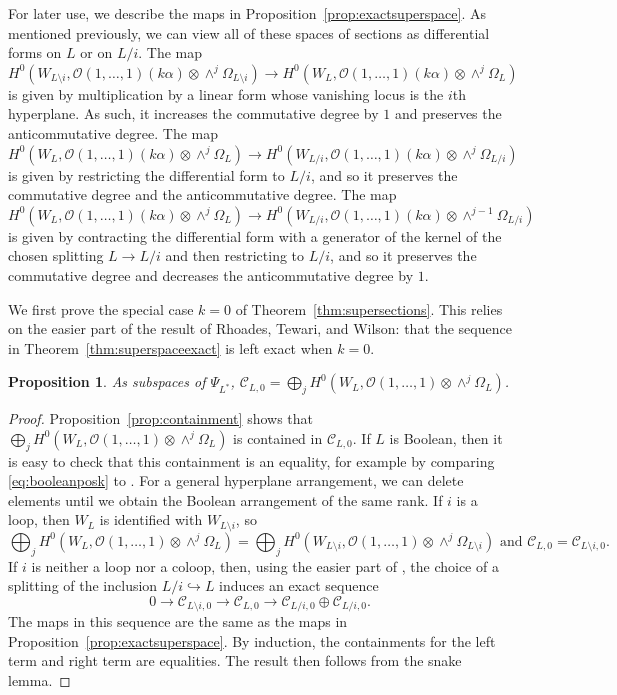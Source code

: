\documentclass{amsart}
\newtheorem{proposition}[theorem]{Proposition}
\theoremstyle{definition}
\begin{document}
For later use, we describe the maps in Proposition~\ref{prop:exactsuperspace}. As mentioned previously, we can view all of these spaces of sections as differential forms on $L$ or on $L/i$. 
The map $H^0(W_{L \setminus i}, \mathcal{O}(1, \dotsc, 1)(k\alpha) \otimes \wedge^j \Omega_{L \setminus i}) \to H^0(W_{L}, \mathcal{O}(1, \dotsc, 1)(k\alpha) \otimes \wedge^j \Omega_L)$ is given by multiplication by a linear form whose vanishing locus is the $i$th hyperplane. As such, it increases the commutative degree by $1$ and preserves the anticommutative degree. The map $H^0(W_L, \mathcal{O}(1, \dotsc, 1)(k\alpha) \otimes \wedge^j \Omega_L) \to H^0(W_{L/i}, \mathcal{O}(1, \dotsc, 1)(k \alpha) \otimes \wedge^j \Omega_{L/i})$ is given by restricting the differential form to $L/i$, and so it preserves the commutative degree and the anticommutative degree. The map $H^0(W_L, \mathcal{O}(1, \dotsc, 1)(k\alpha) \otimes \wedge^j \Omega_L) \to H^0(W_{L/i}, \mathcal{O}(1, \dotsc, 1)(k \alpha) \otimes \wedge^{j-1} \Omega_{L/i})$ is given by contracting the differential form with a generator of the kernel of the chosen splitting $L \to L/i$ and then restricting to $L/i$, and so it preserves the commutative degree and decreases the anticommutative degree by $1$. 

We first prove the special case $k=0$ of Theorem~\ref{thm:supersections}. This relies on the easier part of the result of Rhoades, Tewari, and Wilson: that the sequence in Theorem~\ref{thm:superspaceexact} is left exact when $k=0$. 

\begin{proposition}\label{prop:inversek=0}
As subspaces of $\Psi_{L^*}$, $\mathcal{C}_{L, 0} =  \bigoplus_j H^0(W_L, \mathcal{O}(1, \dotsc, 1) \otimes \wedge^j \Omega_L)$. 
\end{proposition}

\begin{proof}
Proposition~\ref{prop:containment} shows that $\bigoplus_j H^0(W_L, \mathcal{O}(1, \dotsc, 1) \otimes \wedge^j \Omega_L)$ is contained in $\mathcal{C}_{L, 0}$. If $L$ is Boolean, then it is easy to check that this containment is an equality, for example by comparing \eqref{eq:booleanposk} to \cite[Lemma 3.6]{Superspace}. 
For a general hyperplane arrangement, we can delete elements until we obtain the Boolean arrangement of the same rank. If $i$ is a loop, then $W_L$ is identified with $W_{L \setminus i}$, so 
$$\bigoplus_j H^0(W_L, \mathcal{O}(1, \dotsc, 1) \otimes \wedge^j \Omega_L) = \bigoplus_j H^0(W_{L \setminus i}, \mathcal{O}(1, \dotsc, 1) \otimes \wedge^j \Omega_{L \setminus i})\text{ and }\mathcal{C}_{L, 0} = \mathcal{C}_{L \setminus i, 0}.$$
If $i$ is neither a loop nor a coloop, then, using the easier part of \cite[Lemma 3.10]{Superspace}, the choice of a splitting of the inclusion $L/i \hookrightarrow L$ induces an exact sequence 
$$0 \to \mathcal{C}_{L \setminus i, 0} \to \mathcal{C}_{L, 0} \to \mathcal{C}_{L/i, 0} \oplus \mathcal{C}_{L/i, 0}.$$
The maps in this sequence are the same as the maps in Proposition~\ref{prop:exactsuperspace}. 
By induction, the containments for the left term and right term are equalities. The result then follows from the snake lemma. 
\end{proof}
\end{document}
